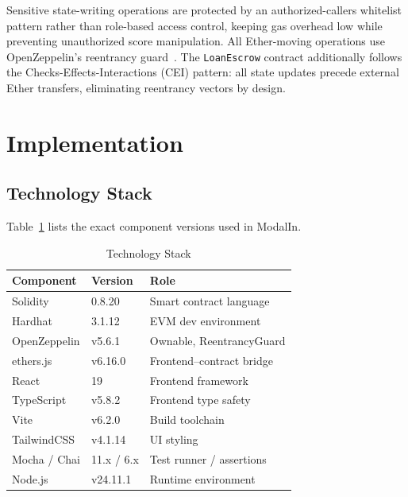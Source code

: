 \documentclass[conference]{IEEEtran}
\begin{document}
Sensitive state-writing operations are protected by an authorized-callers
whitelist pattern rather than role-based access control, keeping gas overhead
low while preventing unauthorized score manipulation. All Ether-moving
operations use OpenZeppelin's reentrancy guard~\cite{b22_oz}. The
\texttt{LoanEscrow} contract additionally follows the Checks-Effects-Interactions
(CEI) pattern: all state updates precede external Ether transfers, eliminating
reentrancy vectors by design.

\section{Implementation}

\subsection{Technology Stack}

Table~\ref{tab:stack} lists the exact component versions used in ModalIn.

\begin{table}[t]
\caption{Technology Stack}
\label{tab:stack}
\centering
\begin{tabular}{lll}
\toprule
\textbf{Component} & \textbf{Version} & \textbf{Role} \\
\midrule
Solidity          & 0.8.20   & Smart contract language \\
Hardhat           & 3.1.12   & EVM dev environment \\
OpenZeppelin      & v5.6.1   & Ownable, ReentrancyGuard \\
ethers.js         & v6.16.0  & Frontend--contract bridge \\
React             & 19       & Frontend framework \\
TypeScript        & v5.8.2   & Frontend type safety \\
Vite              & v6.2.0   & Build toolchain \\
TailwindCSS       & v4.1.14  & UI styling \\
Mocha / Chai      & 11.x / 6.x & Test runner / assertions \\
Node.js           & v24.11.1 & Runtime environment \\
\bottomrule
\end{tabular}
\end{table}
\end{document}
